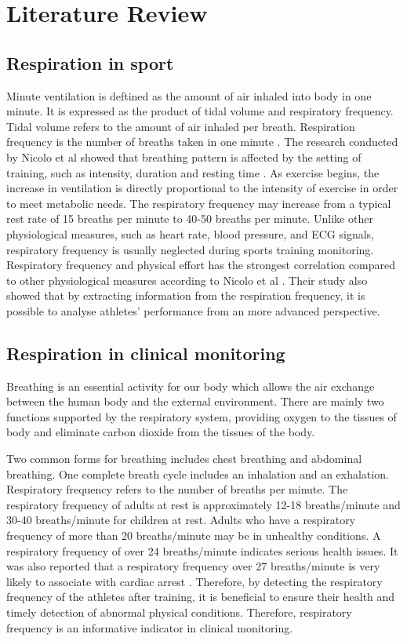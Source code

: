 \chapter{Literature Review}

\section{Respiration in sport}
Minute ventilation is deftined as the amount of air inhaled into body in one minute. It is expressed as the product of tidal volume and respiratory frequency. Tidal volume refers to the amount of air inhaled per breath. Respiration frequency is the number of breaths taken in one minute \cite{Zuurbier2009MinuteStudy}. The research conducted by Nicolo et al showed that breathing pattern is affected by the setting of training, such as intensity, duration and resting time \cite{Nicolo2018RespiratoryInterdependence}. As exercise begins, the increase in ventilation is directly proportional to the intensity of exercise in order to meet metabolic needs. The respiratory frequency may increase from a typical rest rate of 15 breaths per minute to 40-50 breaths per minute. Unlike other physiological measures, such as heart rate, blood pressure, and ECG signals, respiratory frequency is usually neglected during sports training monitoring. Respiratory frequency and physical effort has the strongest correlation compared to other physiological measures according to Nicolo et al \cite{Nicolo2017RespiratoryMeasure}. Their study also showed that by extracting information from the respiration frequency, it is possible to analyse athletes' performance from an more advanced perspective.

\section{Respiration in clinical monitoring}
Breathing is an essential activity for our body which allows the air exchange between the human body and the external environment. There are mainly two functions supported by the respiratory system, providing oxygen to the tissues of body and eliminate carbon dioxide from the tissues of the body. 

Two common forms for breathing includes chest breathing and abdominal breathing. One complete breath cycle includes an inhalation and an exhalation. Respiratory frequency refers to the number of breaths per minute. The respiratory frequency of adults at rest is approximately 12-18 breaths/minute and 30-40 breaths/minute for children at rest. Adults who have a respiratory frequency of more than 20 breaths/minute may be in unhealthy conditions. A respiratory frequency of over 24 breaths/minute indicates serious health issues. It was also reported that a respiratory frequency over 27 breaths/minute is very likely to associate with cardiac arrest \cite{Cretikos2008OfMBA}.  Therefore, by detecting the respiratory frequency of the athletes after training, it is beneficial to ensure their health and timely detection of abnormal physical conditions. Therefore, respiratory frequency is an informative indicator in clinical monitoring.

